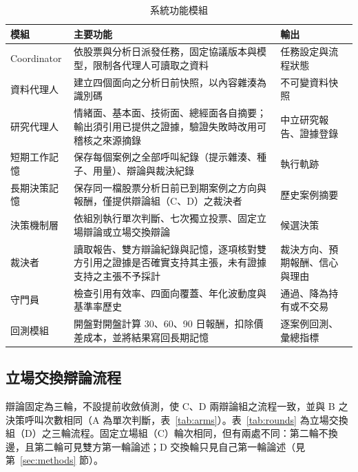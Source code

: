 \documentclass[12pt,a4paper]{article}
\newcommand{\grp}[1]{\textsf{#1}}
\begin{document}
\begin{CJK}{UTF8}{bkai}
\begin{table}[H]
\centering\small
\caption{系統功能模組}
\label{tab:modules}
\begin{tabularx}{\textwidth}{@{}l Y Y@{}}
\toprule
模組 & 主要功能 & 輸出 \\
\midrule
Coordinator & 依股票與分析日派發任務，固定協議版本與模型，限制各代理人可讀取之資料 & 任務設定與流程狀態 \\
資料代理人 & 建立四個面向之分析日前快照，以內容雜湊為識別碼 & 不可變資料快照 \\
研究代理人 & 情緒面、基本面、技術面、總經面各自摘要；輸出須引用已提供之證據，驗證失敗時改用可稽核之來源摘錄 & 中立研究報告、證據登錄 \\
短期工作記憶 & 保存每個案例之全部呼叫紀錄（提示雜湊、種子、用量）、辯論與裁決紀錄 & 執行軌跡 \\
長期決策記憶 & 保存同一檔股票分析日前已到期案例之方向與報酬，僅提供辯論組（\grp{C}、\grp{D}）之裁決者 & 歷史案例摘要 \\
決策機制層 & 依組別執行單次判斷、七次獨立投票、固定立場辯論或立場交換辯論 & 候選決策 \\
裁決者 & 讀取報告、雙方辯論紀錄與記憶，逐項核對雙方引用之證據是否確實支持其主張，未有證據支持之主張不予採計 & 裁決方向、預期報酬、信心與理由 \\
守門員 & 檢查引用有效率、四面向覆蓋、年化波動度與基準率歷史 & 通過、降為持有或不交易 \\
回測模組 & 開盤對開盤計算 30、60、90 日報酬，扣除價差成本，並將結果寫回長期記憶 & 逐案例回測、彙總指標 \\
\bottomrule
\end{tabularx}
\end{table}

\subsection{立場交換辯論流程}

辯論固定為三輪，不設提前收斂偵測，使 \grp{C}、\grp{D} 兩辯論組之流程一致，並與 \grp{B} 之決策呼叫次數相同（\grp{A} 為單次判斷，表~\ref{tab:arms}）。表~\ref{tab:rounds} 為立場交換組（\grp{D}）之三輪流程。固定立場組（\grp{C}）輪次相同，但有兩處不同：第二輪不換邊，且第二輪可見雙方第一輪論述；\grp{D} 交換輪只見自己第一輪論述（見第~\ref{sec:methods} 節）。


\end{CJK}
\end{document}
